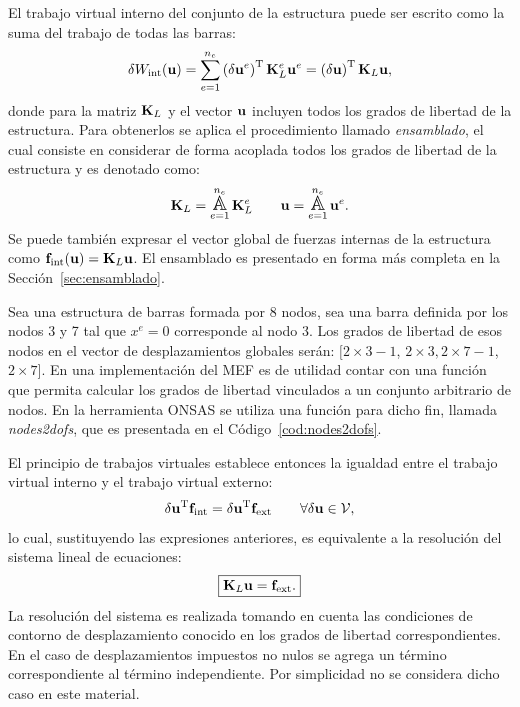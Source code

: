El trabajo virtual interno del conjunto de la estructura puede ser escrito como la suma del trabajo de todas las barras:
%
\begin{equation}
\delta W_{\text{int}}({\bf u}) = \sum_{e=1}^{n_e} \left(\delta {\bf u}^e\right)^{\text{T}} {\bf K}_L^e {\bf u}^e = \left(\delta {\bf u} \right)^{\text{T}} {\bf K}_L {\bf u},
\end{equation}
%
donde para la matriz ${\bf K}_L$ y el vector ${\bf u}$ incluyen todos los grados de libertad de la estructura. %
%
Para obtenerlos se aplica el procedimiento llamado \textit{ensamblado}, el cual consiste en considerar de forma acoplada todos los grados de libertad de la estructura y es denotado como:
%
\begin{equation}
\bfK_L = \assem_{e=1}^{n_e} \bfK_L^e \qquad   \bfu = \assem_{e=1}^{n_e} \bfu^e.
\end{equation}
%
Se puede también expresar el vector global de fuerzas internas de la estructura como ${\bf f}_{\text{int}} ({\bf u}) = {\bf K}_L {\bf u}$. %
%
El ensamblado es presentado en forma más completa en la Sección~\ref{sec:ensamblado}. 

Sea una estructura de barras formada por 8 nodos, sea una barra definida por los nodos 3 y 7 tal que $x^e=0$ corresponde al nodo 3. %
%
Los grados de libertad de esos nodos en el vector de desplazamientos globales serán: $[ 2\times 3 -1$, $2\times 3, 2\times 7 -1$, $2\times 7]$. %
%
En una implementación del MEF es de utilidad contar con una función que permita calcular los grados de libertad vinculados a un conjunto arbitrario de nodos. %
%
En la herramienta ONSAS se utiliza una función para dicho fin, llamada \textit{nodes2dofs}, que es presentada en el Código~\ref{cod:nodes2dofs}.

El principio de trabajos virtuales establece entonces la igualdad entre el trabajo virtual interno y el trabajo virtual externo:
\begin{equation}
\delta {\bf u}^{\text{T}} {\bf f}_{\text{int}} =
\delta {\bf u}^{\text{T}} {\bf f}_{\text{ext}}  \qquad \forall \delta {\bf u} \in {\mathcal V},
\end{equation}
lo cual, sustituyendo las expresiones anteriores, es equivalente a la resolución del sistema lineal de ecuaciones:
%
\begin{equation}
\boxed{
	{\bf K}_L {\bf u} = {\bf f}_{\text{ext}}.
}
\end{equation}
La resolución del sistema es realizada tomando en cuenta las condiciones de contorno de desplazamiento conocido en los grados de libertad correspondientes. %
%
En el caso de desplazamientos impuestos no nulos se agrega un término correspondiente al término independiente. Por simplicidad no se considera dicho caso en este material. %


